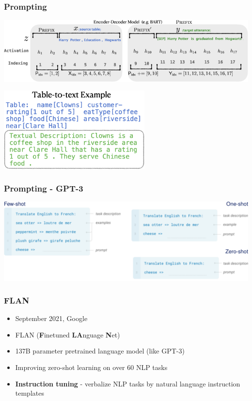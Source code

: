 \documentclass{beamer}
\begin{document}
\begin{frame}
    \frametitle{Prompting \cite{prefix_tuning}}
    \begin{center}
        \includegraphics[scale=1.7]{img/prefix_models_encoder_decoder.png}
    \end{center}
    \begin{center}
        \includegraphics[scale=1.5]{img/prefix_models_encoder_decoder_example.png}
    \end{center}
\end{frame}

\begin{frame}
    \frametitle{Prompting - GPT-3 \cite{gpt3}}
    \begin{center}
        \includegraphics[scale=1.35]{img/gpt3_all_shot.png}
    \end{center}
\end{frame}


\begin{frame}
    \frametitle{FLAN}
    \begin{itemize}
        \item September 2021, Google
        \item FLAN (\textbf{F}inetuned \textbf{LA}nguage \textbf{N}et) \cite{flan}
        \item 137B parameter pretrained language model (like GPT-3)
        \item Improving zero-shot learning on over 60 NLP tasks
        \item \textbf{Instruction tuning} - verbalize NLP tasks by natural language instruction templates
    \end{itemize}
\end{frame}
\end{document}
